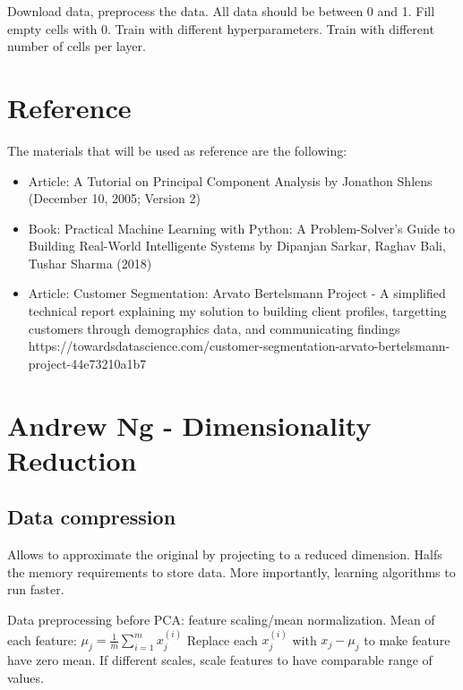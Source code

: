 Download data, preprocess the data. All data should be between 0 and 1.
Fill empty cells with 0. Train with different hyperparameters. Train
with different number of cells per layer.

\hypertarget{reference}{%
\section{Reference}\label{reference}}

The materials that will be used as reference are the following:

\begin{itemize}
\item
  Article: A Tutorial on Principal Component Analysis by Jonathon Shlens
  (December 10, 2005; Version 2)
\item
  Book: Practical Machine Learning with Python: A Problem-Solver's Guide
  to Building Real-World Intelligente Systems by Dipanjan Sarkar, Raghav
  Bali, Tushar Sharma (2018)
\item
  Article: Customer Segmentation: Arvato Bertelsmann Project - A
  simplified technical report explaining my solution to building client
  profiles, targetting customers through demographics data, and
  communicating findings
  https://towardsdatascience.com/customer-segmentation-arvato-bertelsmann-project-44e73210a1b7
\end{itemize}

\hypertarget{andrew-ng---dimensionality-reduction}{%
\section{Andrew Ng - Dimensionality
Reduction}\label{andrew-ng---dimensionality-reduction}}

\hypertarget{data-compression}{%
\subsection{Data compression}\label{data-compression}}

Allows to approximate the original by projecting to a reduced dimension.
Halfs the memory requirements to store data. More importantly, learning
algorithms to run faster.

Data preprocessing before PCA: feature scaling/mean normalization. Mean
of each feature:
\(\mu_j = \frac{1}{m} \displaystyle\sum^{m}_{i=1}x_j^{(i)}\) Replace
each \(x_j^{(i)}\) with \(x_j - \mu_j\) to make feature have zero mean.
If different scales, scale features to have comparable range of values.

